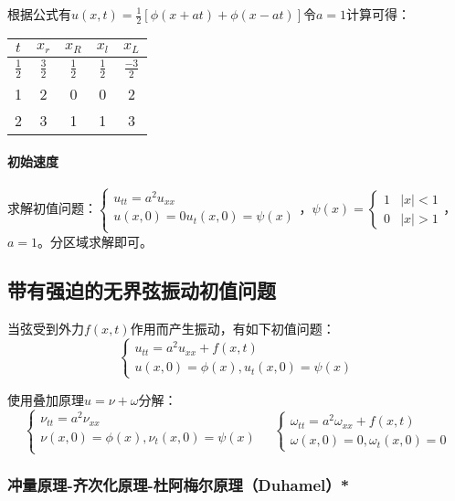 根据公式有\(u(x,t)=\frac{1}{2}[\phi(x+at)+\phi(x-at)]\)令\(a=1\)计算可得：
\begin{center}
    \begin{tabular}{|c|c|c|c|c|}
        \hline
        \(t\) & \(x_r\) & \(x_R\) & \(x_l\) & \(x_L\)\\
        \hline
        \(\frac{1}{2}\) & \(\frac{3}{2}\) & \(\frac{1}{2}\) & \(\frac{1}{2}\) & \(\frac{-3}{2}\)\\
        \hline
        1 & 2 & 0 & 0 & 2 \\
        \hline
        2 & 3 & 1 & 1 & 3 \\
        \hline
    \end{tabular}
\end{center}

\paragraph{初始速度}求解初值问题：\(\begin{cases}u_{tt}=a^2u_{xx}\\u(x,0)=0u_t(x,0)=\psi(x)\\\end{cases}\)，\(\psi(x)=\begin{cases}1&|x|<1\\0&|x|>1\end{cases}\)，\(a=1\)。分区域求解即可。

\subsection{带有强迫的无界弦振动初值问题}

当弦受到外力\(f(x,t)\)作用而产生振动，有如下初值问题：
\[\begin{cases}u_{tt}=a^2u_{xx}+f(x,t)\\u(x,0)=\phi(x),u_t(x,0)=\psi(x)\end{cases}\]

使用叠加原理\(u=\nu+\omega\)分解：
\[
\begin{cases}\nu_{tt}=a^2\nu_{xx}\\\nu(x,0)=\phi(x),\nu_t(x,0)=\psi(x)\\\end{cases}\quad\begin{cases}\omega_{tt}=a^2\omega_{xx}+f(x,t)\\\omega(x,0)=0,\omega_t(x,0)=0\end{cases}
\]

\subsubsection{冲量原理-齐次化原理-杜阿梅尔原理（Duhamel）*}

